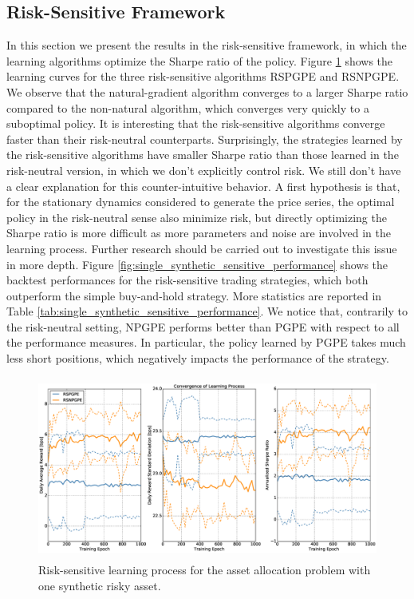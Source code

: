 \subsection{Risk-Sensitive Framework}
In this section we present the results in the risk-sensitive framework, in which the learning algorithms optimize the Sharpe ratio of the policy. Figure \ref{fig:single_synthetic_sensitive_convergence} shows the learning curves for the three risk-sensitive algorithms RSPGPE and RSNPGPE. We observe that the natural-gradient algorithm converges to a larger Sharpe ratio compared to the non-natural algorithm, which converges very quickly to a suboptimal policy. It is interesting that the risk-sensitive algorithms converge faster than their risk-neutral counterparts. Surprisingly, the strategies learned by the risk-sensitive algorithms have smaller Sharpe ratio than those learned in the risk-neutral version, in which we don't explicitly control risk. We still don't have a clear explanation for this counter-intuitive behavior. A first hypothesis is that, for the stationary dynamics considered to generate the price series, the optimal policy in the risk-neutral sense also minimize risk, but directly optimizing the Sharpe ratio is more difficult as more parameters and noise are involved in the learning process. Further research should be carried out to investigate this issue in more depth. Figure \ref{fig:single_synthetic_sensitive_performance} shows the backtest performances for the risk-sensitive trading strategies, which both outperform the simple buy-and-hold strategy. More statistics are reported in Table \ref{tab:single_synthetic_sensitive_performance}. We notice that, contrarily to the risk-neutral setting, NPGPE performs better than PGPE with respect to all the performance measures. In particular, the policy learned by PGPE takes much less short positions, which negatively impacts the performance of the strategy.

\begin{figure}[t!]
	\centering
	\includegraphics[height=6cm,width=1.0\textwidth]{Images/8_4_single_synthetic_sensitive_convergence}
	\caption[Risk-sensitive learning process for one synthetic risky asset]{Risk-sensitive learning process for the asset allocation problem with one synthetic risky asset.}
	\label{fig:single_synthetic_sensitive_convergence}
\end{figure}

